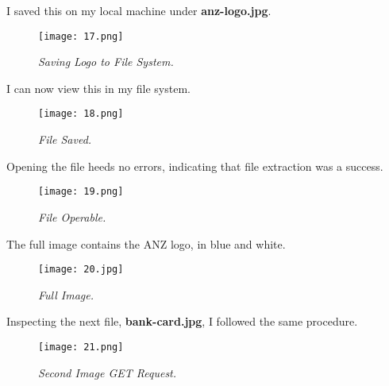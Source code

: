 I saved this on my local machine under \textbf{anz-logo.jpg}.

\begin{figure}[H]
    \setlength{\abovecaptionskip}{20pt}
    \setlength{\belowcaptionskip}{0pt}
    \centering
    \texttt{[image: 17.png]}
    \captionsetup{justification=centering}
    \caption{\textit{Saving Logo to File System.}}
    \label{fig:17}
\end{figure}
\vspace{-10pt}

I can now view this in my file system.

\begin{figure}[H]
    \setlength{\abovecaptionskip}{20pt}
    \setlength{\belowcaptionskip}{0pt}
    \centering
    \texttt{[image: 18.png]}
    \captionsetup{justification=centering}
    \caption{\textit{File Saved.}}
    \label{fig:18}
\end{figure}
\vspace{-10pt}

Opening the file heeds no errors, indicating that file extraction was a success.

\begin{figure}[H]
    \setlength{\abovecaptionskip}{20pt}
    \setlength{\belowcaptionskip}{0pt}
    \centering
    \texttt{[image: 19.png]}
    \captionsetup{justification=centering}
    \caption{\textit{File Operable.}}
    \label{fig:19}
\end{figure}
\vspace{-10pt}

The full image contains the ANZ logo, in blue and white.

\begin{figure}[H]
    \setlength{\abovecaptionskip}{20pt}
    \setlength{\belowcaptionskip}{0pt}
    \centering
    \texttt{[image: 20.jpg]}
    \captionsetup{justification=centering}
    \caption{\textit{Full Image.}}
    \label{fig:20}
\end{figure}
\vspace{-10pt}

Inspecting the next file, \textbf{bank-card.jpg}, I followed the same procedure.

\begin{figure}[H]
    \setlength{\abovecaptionskip}{20pt}
    \setlength{\belowcaptionskip}{0pt}
    \centering
    \texttt{[image: 21.png]}
    \captionsetup{justification=centering}
    \caption{\textit{Second Image GET Request.}}
    \label{fig:21}
\end{figure}
\vspace{-10pt}

